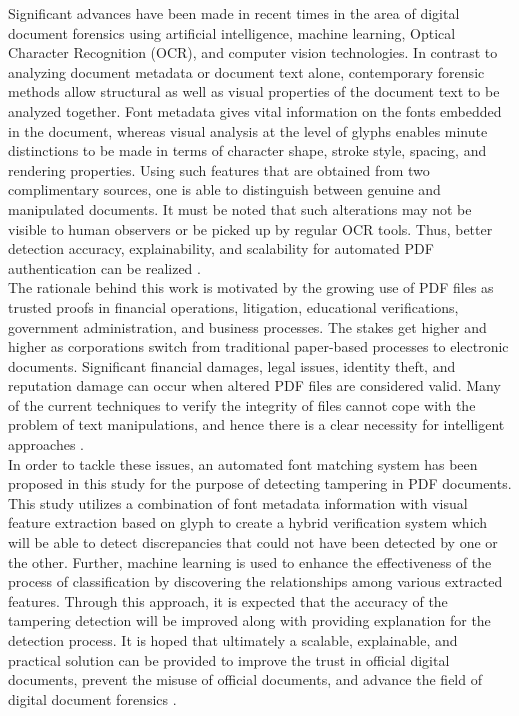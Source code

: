 \noindent Significant advances have been made in recent times in the area of digital document forensics using artificial intelligence, machine learning, Optical Character Recognition (OCR), and computer vision technologies. In contrast to analyzing document metadata or document text alone, contemporary forensic methods allow structural as well as visual properties of the document text to be analyzed together. Font metadata gives vital information on the fonts embedded in the document, whereas visual analysis at the level of glyphs enables minute distinctions to be made in terms of character shape, stroke style, spacing, and rendering properties. Using such features that are obtained from two complimentary sources, one is able to distinguish between genuine and manipulated documents. It must be noted that such alterations may not be visible to human observers or be picked up by regular OCR tools. Thus, better detection accuracy, explainability, and scalability for automated PDF authentication can be realized \cite{Ahmed2025AIForgeries}.\\

\noindent The rationale behind this work is motivated by the growing use of PDF files as trusted proofs in financial operations, litigation, educational verifications, government administration, and business processes. The stakes get higher and higher as corporations switch from traditional paper-based processes to electronic documents. Significant financial damages, legal issues, identity theft, and reputation damage can occur when altered PDF files are considered valid. Many of the current techniques to verify the integrity of files cannot cope with the problem of text manipulations, and hence there is a clear necessity for intelligent approaches \cite{Nikkel2020Fintech}.\\

\noindent In order to tackle these issues, an automated font matching system has been proposed in this study for the purpose of detecting tampering in PDF documents. This study utilizes a combination of font metadata information with visual feature extraction based on glyph to create a hybrid verification system which will be able to detect discrepancies that could not have been detected by one or the other. Further, machine learning is used to enhance the effectiveness of the process of classification by discovering the relationships among various extracted features. Through this approach, it is expected that the accuracy of the tampering detection will be improved along with providing explanation for the detection process. It is hoped that ultimately a scalable, explainable, and practical solution can be provided to improve the trust in official digital documents, prevent the misuse of official documents, and advance the field of digital document forensics \cite{Kumar2025RealTimeFraud}.


